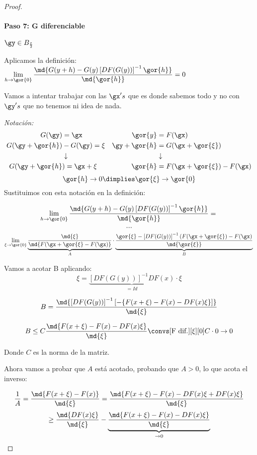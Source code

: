 \documentclass{apuntes}
\begin{document}
\begin{proof}
  \paragraph{Paso 7: G diferenciable}  $\gy \in B_{\frac{\varepsilon}{2}}$
  
  Aplicamos la definición: $\displaystyle\lim_{h \rightarrow \gor{0}}\frac{\md{G(y+h) - G(y) \left[DF(G(y))\right]^{-1} \gor{h}}}{\md{\gor{h}}} = 0$
  
  Vamos a intentar trabajar con las $\gx's$ que es donde sabemos todo y no con $\gy's$ que no tenemos ni idea de nada.
  
  \emph{Notación:}
  \begin{align*}
G(\gy) &= \gx & \gor{y} &= F(\gx)\\
G(\gy + \gor{h}) &- G(\gy) = \xi & \gy + \gor{h} &= G(\gx + \gor{\xi})\\
&\downarrow&\ &\downarrow\\
G(\gy + \gor{h}&) = \gx + \xi & \gor{h} &= F(\gx + \gor{\xi}) - F(\gx)
\end{align*}
$$\gor{h} \rightarrow 0 \dimplies \gor{\xi} \rightarrow \gor{0}$$
  Sustituimos con esta notación en la definición:
  
 
  $$\lim_{h \rightarrow \gor{0}}\frac{\md{G(y+h) - G(y) \left[DF(G(y))\right]^{-1} \gor{h}}}{\md{\gor{h}}} = \\$$
  $$...\\$$
  $$\lim_{\xi\rightarrow \gor{0}} \underbrace{\frac{\md{\xi}}{\md{F(\gx + \gor{\xi} - F(\gx)}}}_{A} %
  \cdot \underbrace{\frac{\gor{\xi} - \left[DF(G(y))\right]^{-1} (F(\gx +\gor{\xi}) - F(\gx)}{\md{\gor{\xi}}}}_{B}\\   $$
  
  Vamos a acotar B aplicando:
  $$\xi = \underbrace{\left[DF(G(y))\right]^{-1}DF(x)}_{=Id} \cdot \xi$$

  $$B = \frac{\md{\left[DF(G(y))\right]^{-1} \left[ -\{F(x+\xi)-F(x) - DF(x)\xi\}\right]}}{\md{\xi}}$$
  
  $$B\leq C \frac{\md{F(x+\xi) - F(x) - DF(x)\xi}}{\md{\xi}} \convs[\text{F dif.}][\xi][0] C\cdot 0 \rightarrow 0$$
  
  Donde $C$ es la norma de la matriz. 

 
  Ahora vamos a probar que $A$ está acotado, probando que $A>0$, lo que acota el inverso:
  
  $$\frac{1}{A} = \frac{\md{F(x+\xi)-F(x)}}{\md{\xi}} = \frac{\md{F(x+\xi) - F(x) - DF(x)\xi + DF(x)\xi}}{\md{\xi}}$$
  $$\geq \frac{\md{DF(x)\xi}}{\md{\xi}} - \underbrace{\frac{\md{F(x+\xi) - F(x) - DF(x)\xi}}{\md{\xi}}}_{\rightarrow 0}$$
  

\end{proof}
\end{document}
